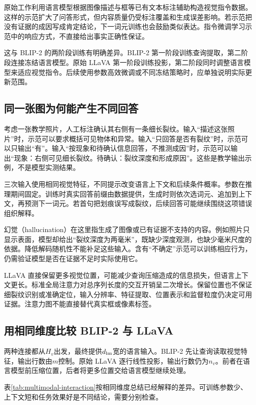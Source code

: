 原始工作利用语言模型根据图像描述与框等已有文本标注辅助构造视觉指令数据。这样的示范扩大了问答形式，但内容质量仍受标注覆盖和生成误差影响。若示范把没有证据的成因写成肯定结论，下一词元训练也会鼓励类似表达。指令微调学习示范中的响应方式，不直接给出事实正确性保证。

这与 BLIP-2 的两阶段训练有明确差异。BLIP-2 第一阶段训练查询提取，第二阶段连接冻结语言模型。原始 LLaVA 第一阶段训练投影，第二阶段同时调整语言模型来适应视觉指令。后续使用参数高效微调或不同冻结策略时，应单独说明实际更新范围。

\subsection{同一张图为何能产生不同回答}
考虑一张教学照片，人工标注确认其右侧有一条细长裂纹。输入“描述这张照片”时，示范可以要求概括可见物体和异常。输入“只回答是否有裂纹”时，示范可以只输出“有”。输入“按现象和待确认信息回答，不推测成因”时，示范可以输出“现象：右侧可见细长裂纹。待确认：裂纹深度和形成原因”。这些是教学输出示例，不是模型实测结果。

三次输入使用相同视觉特征，不同提示改变语言上下文和后续条件概率。参数在推理期间固定。训练时真实回答前缀由数据提供，生成时则依次选词元、追加到上下文，再预测下一词元。若首句把划痕误写成裂纹，后续回答可能继续围绕这项错误组织解释。

幻觉（hallucination）在这里指生成了图像或已有证据不支持的内容。例如照片只显示表面，模型却给出“裂纹深度为两毫米”，既缺少深度观测，也缺少毫米尺度的依据。降低解码随机性不能补足这些输入。含有“不确定”示范可以训练相应行为，仍需验证模型是否在证据不足时实际使用它。

LLaVA 直接保留更多视觉位置，可能减少查询压缩造成的信息损失，但语言上下文更长。标准全局注意力对总序列长度的交互开销呈二次增长。保留位置也不保证细裂纹识别或准确定位，输入分辨率、特征提取、位置表示和监督粒度仍决定可用证据。注意力图不能直接替代真实框或像素标签。

\subsection{用相同维度比较 BLIP-2 与 LLaVA}
两种连接都从$H_v$出发，最终提供$d_{\rm lm}$宽的语言输入。BLIP-2 先让查询读取视觉特征，输出行数由$m$控制。原始 LLaVA 逐行线性投影，输出行数仍为$n_v$。前者在语言模型前压缩位置，后者将更多位置交给语言模型继续处理。

表\ref{tab:multimodal-interaction}按相同维度总结已经解释的差异。可训练参数少、上下文短和任务效果好是不同结论，需要分别检查。


